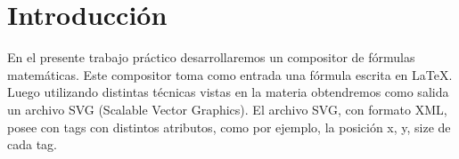 \section{Introducción}
En el presente trabajo pr\'actico desarrollaremos un compositor de f\'ormulas matem\'aticas. Este compositor toma como entrada una f\'ormula escrita en \LaTeX \hspace{0.1cm}. Luego utilizando distintas t\'ecnicas vistas en la materia obtendremos como salida un archivo SVG (Scalable Vector Graphics).
El archivo SVG, con formato XML, posee con tags con distintos atributos, como por ejemplo, la posici\'on x, y, size de cada tag.
